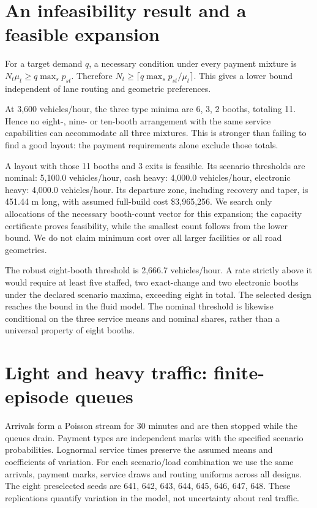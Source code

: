 \documentclass[12pt,letterpaper]{article}
\begin{document}
\section{An infeasibility result and a feasible expansion}
For a target demand $q$, a necessary condition under every payment mixture is $N_t\mu_t\ge q\max_s p_{st}$. Therefore $N_t\ge\lceil q\max_s p_{st}/\mu_t\rceil$. This gives a lower bound independent of lane routing and geometric preferences.

At 3,600 vehicles/hour, the three type minima are 6, 3, 2 booths, totaling 11. Hence no eight-, nine- or ten-booth arrangement with the same service capabilities can accommodate all three mixtures. This is stronger than failing to find a good layout: the payment requirements alone exclude those totals.

A layout with those 11 booths and 3 exits is feasible. Its scenario thresholds are nominal: 5,100.0 vehicles/hour, cash heavy: 4,000.0 vehicles/hour, electronic heavy: 4,000.0 vehicles/hour. Its departure zone, including recovery and taper, is 451.44 m long, with assumed full-build cost \$3,965,256. We search only allocations of the necessary booth-count vector for this expansion; the capacity certificate proves feasibility, while the smallest count follows from the lower bound. We do not claim minimum cost over all larger facilities or all road geometries.

The robust eight-booth threshold is 2,666.7 vehicles/hour. A rate strictly above it would require at least five staffed, two exact-change and two electronic booths under the declared scenario maxima, exceeding eight in total. The selected design reaches the bound in the fluid model. The nominal threshold is likewise conditional on the three service means and nominal shares, rather than a universal property of eight booths.

\section{Light and heavy traffic: finite-episode queues}
Arrivals form a Poisson stream for 30 minutes and are then stopped while the queues drain. Payment types are independent marks with the specified scenario probabilities. Lognormal service times preserve the assumed means and coefficients of variation. For each scenario/load combination we use the same arrivals, payment marks, service draws and routing uniforms across all designs. The eight preselected seeds are 641, 642, 643, 644, 645, 646, 647, 648. These replications quantify variation in the model, not uncertainty about real traffic.
\end{document}
